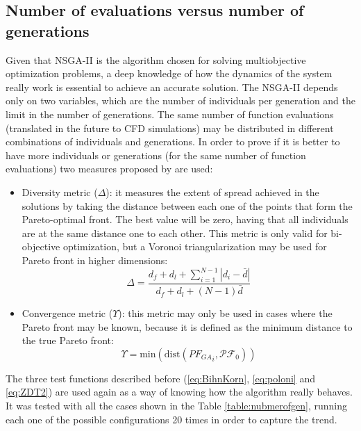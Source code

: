 \subsection{Number of evaluations versus number of generations}

Given that NSGA-II is the algorithm chosen for solving multiobjective optimization problems, a deep knowledge of how the dynamics of the system really work is essential to achieve an accurate solution. The NSGA-II depends only on two variables, which are the number of individuals per generation and the limit in the number of generations. The same number of function evaluations (translated in the future to CFD simulations) may be distributed in different combinations of individuals and generations. In order to prove if it is better to have more individuals or generations (for the same number of function evaluations) two measures proposed by \cite{deb2002fast} are used:
\begin{itemize}
    \item Diversity metric ($\Delta$): it measures the extent of spread achieved in the solutions by taking the distance between each one of the points that form the Pareto-optimal front. The best value will be zero, having that all individuals are at the same distance one to each other. This metric is only valid for bi-objective optimization, but a Voronoi triangularization may be used for Pareto front in higher dimensions: 
    \begin{equation}
        \displaystyle \Delta = \dfrac{d_f+d_l+\sum^{N-1}_{i=1}|d_i-\bar{d}|}{d_f+d_l+(N-1)\bar{d}}
    \end{equation}
\item Convergence metric ($\Upsilon$): this metric may only be used in cases where the Pareto front may be known, because it is defined as the minimum distance to the true Pareto front:
\begin{equation}
    \Upsilon =  \text{min} (\text{dist}({PF_{GA}}_i,\mathcal{PF}_0)) 
\end{equation}
\end{itemize}


\newpage

The three test functions described before (\ref{eq:BihnKorn}, \ref{eq:poloni} and \ref{eq:ZDT2}) are used again as a way of knowing how the algorithm really behaves. It was tested with all the cases shown in the Table \ref{table:nubmerofgen}, running each one of the possible configurations 20 times in order to capture the trend. 

